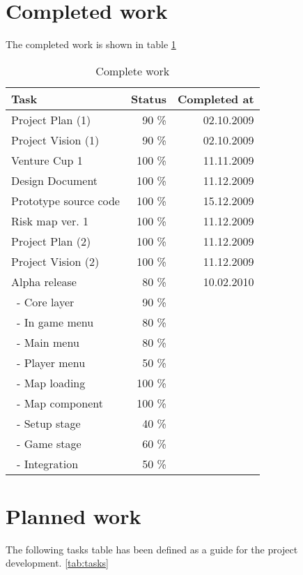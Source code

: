 \documentclass[12pt,a4paper]{article}
\begin{document}
\section{Completed work}

The completed work is shown in table \ref{tab:compwork}

\begin{table}[h!]
\small
\begin{tabular}{ l | r | r}
Task					&Status	&Completed at\\\hline\hline
Project Plan (1)			&90 \%	&02.10.2009\\
Project Vision (1)		&90 \%	&02.10.2009\\
Venture Cup 1			&100 \%	&11.11.2009\\
Design Document		&100 \%	&11.12.2009\\
Prototype source code	&100 \%	&15.12.2009\\
Risk map ver. 1			&100 \%	&11.12.2009\\
Project Plan (2)			&100 \%	&11.12.2009\\
Project Vision (2)		&100 \%	&11.12.2009\\
Alpha release			&80 \%	&10.02.2010\\
\ - Core layer			&90 \%	&\\
\ - In game menu		&80 \%	&\\
\ - Main menu			&80 \%	&\\
\ - Player menu			&50 \%	&\\
\ - Map loading			&100 \%	&\\
\ - Map component		&100 \%	&\\
\ - Setup stage			&40 \%	&\\
\ - Game stage			&60 \%	&\\
\ - Integration			&50 \%	&
\end{tabular}
\caption{Complete work}
\label{tab:compwork}
\end{table}

\section{Planned work}

The following tasks table has been defined as a guide for the project development. \ref{tab:tasks}
\end{document}

